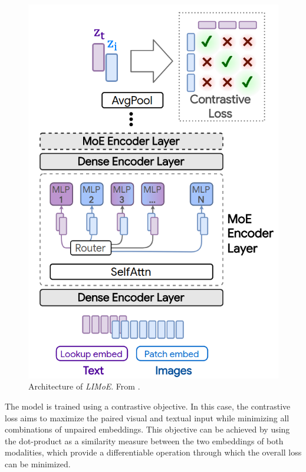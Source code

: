 \documentclass[
]{krantz}
\begin{document}
\begin{figure}

{\centering \includegraphics[width=0.8\linewidth]{figures/03-03-multipurpose/LIMoE} 

}

\caption{Architecture of \emph{LIMoE}. From \citet{Mustafa2022}.}\label{fig:LIMoE}
\end{figure}



The model is trained using a contrastive objective. In this case, the contrastive loss aims to maximize the paired visual and textual input while minimizing all combinations of unpaired embeddings.
This objective can be achieved by using the dot-product as a similarity measure between the two embeddings of both modalities, which provide a differentiable
operation through which the overall loss can be minimized.
\end{document}
